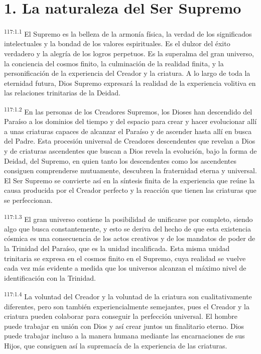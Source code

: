 \documentclass[twoside, 11pt]{book}
\begin{document}
\section*{1. La naturaleza del Ser Supremo}
\par
\textsuperscript{117:1.1} El Supremo es la belleza de la armonía física, la verdad de los significados intelectuales y la bondad de los valores espirituales. Es el dulzor del éxito verdadero y la alegría de los logros perpetuos. Es la superalma del gran universo, la conciencia del cosmos finito, la culminación de la realidad finita, y la personificación de la experiencia del Creador y la criatura. A lo largo de toda la eternidad futura, Dios Supremo expresará la realidad de la experiencia volitiva en las relaciones trinitarias de la Deidad.

\par
\textsuperscript{117:1.2} En las personas de los Creadores Supremos, los Dioses han descendido del Paraíso a los dominios del tiempo y del espacio para crear y hacer evolucionar allí a unas criaturas capaces de alcanzar el Paraíso y de ascender hasta allí en busca del Padre. Esta procesión universal de Creadores descendentes que revelan a Dios y de criaturas ascendentes que buscan a Dios revela la evolución, bajo la forma de Deidad, del Supremo, en quien tanto los descendentes como los ascendentes consiguen comprenderse mutuamente, descubren la fraternidad eterna y universal. El Ser Supremo se convierte así en la síntesis finita de la experiencia que reúne la causa producida por el Creador perfecto y la reacción que tienen las criaturas que se perfeccionan.

\par
\textsuperscript{117:1.3} El gran universo contiene la posibilidad de unificarse por completo, siendo algo que busca constantemente, y esto se deriva del hecho de que esta existencia cósmica es una consecuencia de los actos creativos y de los mandatos de poder de la Trinidad del Paraíso, que es la unidad incalificada. Esta misma unidad trinitaria se expresa en el cosmos finito en el Supremo, cuya realidad se vuelve cada vez más evidente a medida que los universos alcanzan el máximo nivel de identificación con la Trinidad.

\par
\textsuperscript{117:1.4} La voluntad del Creador y la voluntad de la criatura son cualitativamente diferentes, pero son también experiencialmente semejantes, pues el Creador y la criatura pueden colaborar para conseguir la perfección universal. El hombre puede trabajar en unión con Dios y así crear juntos un finalitario eterno. Dios puede trabajar incluso a la manera humana mediante las encarnaciones de sus Hijos, que consiguen así la supremacía de la experiencia de las criaturas.
\end{document}
